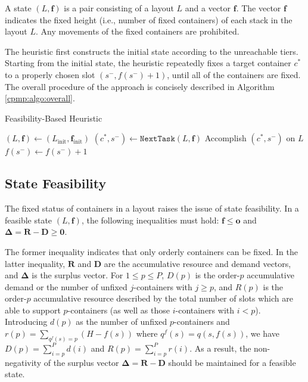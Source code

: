 \documentclass{article}
\begin{document}
A state $(L,\boldsymbol{f})$ is a pair consisting of a layout $L$ and a vector $\boldsymbol{f}$. The vector $\boldsymbol{f}$ indicates the fixed height (i.e., number of fixed containers) of each stack in the layout $L$. 
Any movements of the fixed containers are prohibited.

The heuristic first constructs the initial state according to the unreachable tiers. Starting from the initial state, the heuristic repeatedly fixes a target container $c^*$ to a properly chosen slot $(s^-,f(s^-)+1)$, until all of the containers are fixed. The overall procedure of the approach is concisely described in Algorithm \ref{cpmp:algo:overall}.

\begin{algorithm}[htbp]
\caption{Feasibility-Based Heuristic}
\label{cpmp:algo:overall}
\Begin
{
  $(L,\boldsymbol{f})\gets (L_\mathrm{init},\boldsymbol{f}_\mathrm{init})$\;
  {
    $(c^*, s^-)\gets \mathtt{NextTask}(L,\boldsymbol{f})$\;
    Accomplish $(c^*, s^-)$ on $L$\;
   $f(s^-)\gets f(s^-)+1$\;
  }
}
\end{algorithm}



\subsection{State Feasibility}

The fixed status of containers in a layout raises the issue of state feasibility.
In a feasible state  $(L,\boldsymbol{f})$, the following inequalities must hold: $\boldsymbol{f}\le \boldsymbol{o}$ and $\boldsymbol{\Delta}=\boldsymbol{R}-\boldsymbol{D}\ge \boldsymbol{0}$.

The former inequality indicates that only orderly containers can be fixed. 
In the latter inequality, $\boldsymbol{R}$ and $\boldsymbol{D}$ are the accumulative resource and demand vectors, and $\boldsymbol{\Delta}$ is the surplus vector. For $1\le p\le P$, $D(p)$ is the order-$p$ accumulative demand or the number of unfixed $j$-containers with $j\ge p$, and $R(p)$ is the order-$p$ accumulative resource described by the total number of slots which are able to support $p$-containers (as well as those $i$-containers with $i< p$). Introducing $d(p)$ as the number of unfixed $p$-containers and $r(p)=\sum_{q^f(s)=p} (H-f(s))$ where $q^f(s)=q(s,f(s))$, we have $D(p)=\sum_{i=p}^P d(i)$ and $R(p)=\sum_{i=p}^P r(i)$. As a result, the non-negativity of the surplus vector $\boldsymbol{\Delta}=\boldsymbol{R}-\boldsymbol{D}$ should be maintained for a feasible state.
\end{document}
